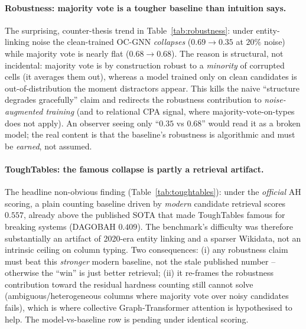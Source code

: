 \paragraph{Robustness: majority vote is a tougher baseline than intuition says.}
The surprising, counter-thesis trend in Table~\ref{tab:robustness}: under
entity-linking noise the clean-trained OC-GNN \emph{collapses} ($0.69\!\to\!0.35$
at $20\%$ noise) while majority vote is nearly flat ($0.68\!\to\!0.68$). The
reason is structural, not incidental: majority vote is by construction robust to a
\emph{minority} of corrupted cells (it averages them out), whereas a model trained
only on clean candidates is out-of-distribution the moment distractors appear.
This kills the naive ``structure degrades gracefully'' claim and redirects the
robustness contribution to \emph{noise-augmented training} (and to relational CPA
signal, where majority-vote-on-types does not apply). An observer seeing only
``$0.35$ vs $0.68$'' would read it as a broken model; the real content is that the
baseline's robustness is algorithmic and must be \emph{earned}, not assumed.

\paragraph{ToughTables: the famous collapse is partly a retrieval artifact.}
The headline non-obvious finding (Table~\ref{tab:toughtables}): under the
\emph{official} AH scoring, a plain counting baseline driven by \emph{modern}
candidate retrieval scores $0.557$, already above the published SOTA that made
ToughTables famous for breaking systems (DAGOBAH $0.409$). The benchmark's
difficulty was therefore substantially an artifact of 2020-era entity linking and
a sparser Wikidata, not an intrinsic ceiling on column typing. Two consequences:
(i) any robustness claim must beat this \emph{stronger} modern baseline, not the
stale published number -- otherwise the ``win'' is just better retrieval; (ii) it
re-frames the robustness contribution toward the residual hardness counting still
cannot solve (ambiguous/heterogeneous columns where majority vote over noisy
candidates fails), which is where collective Graph-Transformer attention is
hypothesised to help. The model-vs-baseline row is pending under identical scoring.

